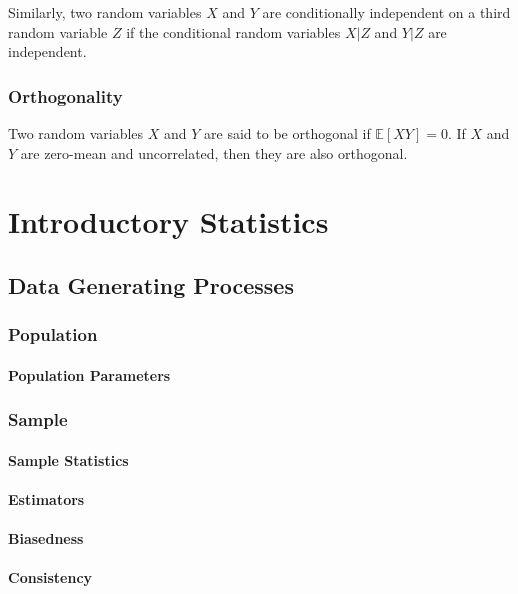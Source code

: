 \documentclass[11pt]{report} %
\begin{document}
Similarly, two random variables $X$ and $Y$ are conditionally independent on a third random variable $Z$ if the conditional random variables $X|Z$ and $Y|Z$ are independent. 

\subsection{Orthogonality \cite{Yates2005}}

Two random variables $X$ and $Y$ are said to be orthogonal if $\mathbb{E}\left[XY\right] = 0$. If $X$ and $Y$ are zero-mean and uncorrelated, then they are also orthogonal.

\chapter{Introductory Statistics}

\section{Data Generating Processes}

\subsection{Population}

\subsubsection{Population Parameters}

\subsection{Sample}

\subsubsection{Sample Statistics}

\subsubsection{Estimators}

\subsubsection{Biasedness}

\subsubsection{Consistency}
\end{document}
